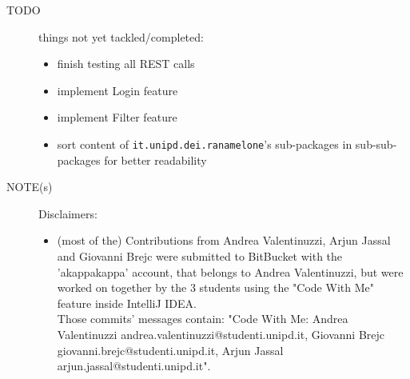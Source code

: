 \begin{description}
    \item[TODO] things not yet tackled/completed:
    \begin{itemize}
        \item finish testing all REST calls
        \item implement Login feature
        \item implement Filter feature
        \item sort content of \verb|it.unipd.dei.ranamelone|'s sub-packages in sub-sub-packages for better readability
    \end{itemize}

    \item[NOTE(s)] Disclaimers:
    \begin{itemize}
        \item (most of the) Contributions from Andrea Valentinuzzi, Arjun Jassal and Giovanni Brejc were submitted to BitBucket with the 'akappakappa' account, that belongs to Andrea Valentinuzzi, but were worked on together by the 3 students using the "Code With Me" feature inside IntelliJ IDEA. \\
        Those commits' messages contain: "Code With Me: Andrea Valentinuzzi andrea.valentinuzzi@studenti.unipd.it, Giovanni Brejc giovanni.brejc@studenti.unipd.it, Arjun Jassal arjun.jassal@studenti.unipd.it".
    \end{itemize}

\end{description}